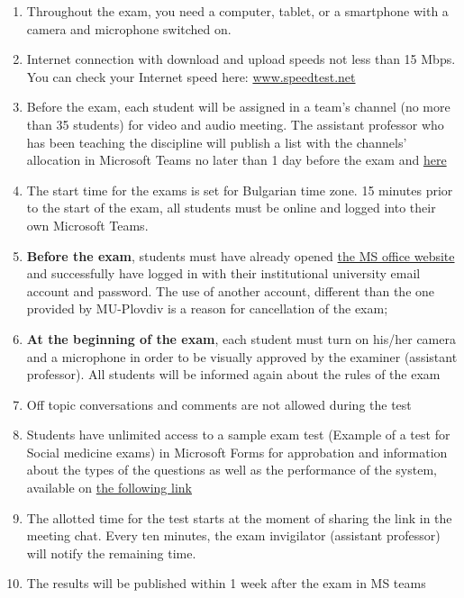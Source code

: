 \documentclass[13pt,a4paper]{article}
\begin{document}
	\begin{enumerate}
		
		\item Throughout the exam, you need a computer, tablet, or a smartphone with a camera and microphone switched on.
		\item Internet connection with download and upload speeds not less than 15 Mbps. You can check your Internet speed here: \href{https://www.speedtest.net/}{www.speedtest.net}
		\item Before the exam, each student will be assigned in a team's channel (no more than 35 students) for video and audio meeting. The assistant professor who has been teaching the discipline will publish a list with the channels' allocation in Microsoft Teams no later than 1 day before the exam and  \href{https://muplovdivbg.sharepoint.com/teams/FacultyofPublicHealth/Shared%20Documents/Forms/AllItems.aspx?csf=1&web=1&e=7TlGGB&cid=c99189b7%2Dd836%2D47cc%2Da5a2%2D3d04885bfeb1&RootFolder=%2Fteams%2FFacultyofPublicHealth%2FShared%20Documents%2F%D0%A1%D0%BE%D1%86%D0%B8%D0%B0%D0%BB%D0%BD%D0%B0%20%D0%BC%D0%B5%D0%B4%D0%B8%D1%86%D0%B8%D0%BD%D0%B0%20%D0%B8%20%D0%BE%D0%B1%D1%89%D0%B5%D1%81%D1%82%D0%B2%D0%B5%D0%BD%D0%BE%20%D0%B7%D0%B4%D1%80%D0%B0%D0%B2%D0%B5%20%2D%20Social%20medicine%20and%20public%20health&FolderCTID=0x012000DAF9907FD71CC142959689FC483FA4AC}{here}
		\item The start time for the exams is set for Bulgarian time zone. 15 minutes prior to the start of the exam, all students must be online and logged into their own Microsoft Teams.
		\item\textbf{Before the exam}, students must have already opened  \href{https://www.office.com/}{the MS office website} and successfully have logged in with their institutional university email account and password. The use of another account, different than the one provided by MU-Plovdiv is a reason for cancellation of the exam;
		\item 	\textbf{At the beginning of the exam}, each student must turn on his/her camera and a microphone in order to be visually approved by the examiner (assistant professor). All students will be informed again about the rules of the exam
		\item Off topic conversations and comments are not allowed during the test
		\item  Students have unlimited access to a sample exam test (Example of a test for Social medicine exams) in Microsoft Forms for approbation and information about the types of the questions as well as the performance of the system, available on \href{https://forms.office.com/Pages/ResponsePage.aspx?id=6myJOQCkhkerbLuRZH_g-R6xkpuTW9FAl9MVrsryF45UQTFKQkU4UjVQOFYzTkVUVVFVVzhGWVRBUy4u&wdLOR=c23E40142-2058-4E02-807D-BF3DE33599A8}{the following link} 
		\item The allotted time for the test starts at the moment of sharing the link in the meeting chat. Every ten minutes, the exam invigilator (assistant professor) will notify  the remaining time.
		\item The results will be published within 1 week after the exam in MS teams
	\end{enumerate}
\end{document}
